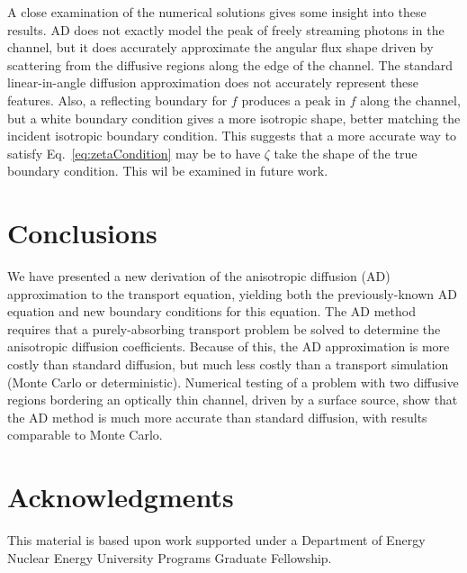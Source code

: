 \documentclass{anstrans}
\begin{document}
A close examination of the numerical solutions gives some insight into these
results.  AD does not exactly model the peak of freely streaming
photons in the channel, but it does accurately approximate the angular flux
shape driven by scattering from the diffusive regions along the edge of the
channel. 
The standard linear-in-angle diffusion approximation does not accurately
represent these
features.  Also, a reflecting boundary for $f$ produces a peak in $f$
along the channel, but a white boundary condition gives a more isotropic shape,
better matching the incident isotropic boundary condition. This suggests that a
more accurate way to satisfy Eq.~\eqref{eq:zetaCondition} may be to have
$\zeta$ take the shape of the true boundary condition. This wil be examined in
future work. 


\section{Conclusions}

We have presented a new derivation of the anisotropic diffusion (AD)
approximation to
the transport equation, yielding both the previously-known AD equation and new
boundary conditions for this equation. The AD method requires that a
purely-absorbing transport problem be solved to determine the anisotropic
diffusion coefficients. Because of this, the AD approximation is more costly
than standard diffusion, but much less costly than a transport simulation
(Monte Carlo or deterministic). Numerical testing of a problem with two
diffusive regions bordering an optically thin channel, driven by a surface
source, show that the AD method is much more accurate than standard diffusion,
with results comparable to Monte Carlo. 

\section{Acknowledgments}
This material is based upon work supported under a Department of Energy Nuclear
Energy University Programs Graduate Fellowship.



\end{document}
